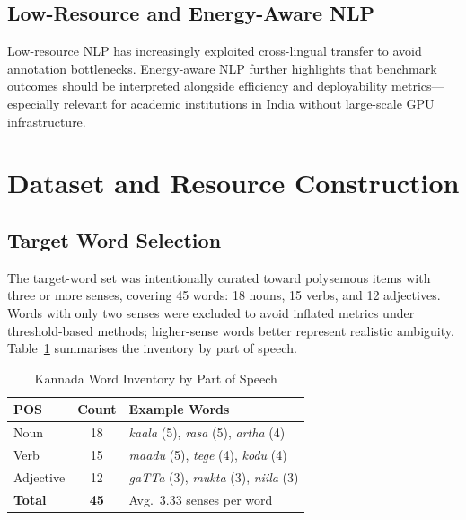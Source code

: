 \documentclass{ieeeaccess}
\begin{document}
\subsection{Low-Resource and Energy-Aware NLP}

Low-resource NLP has increasingly exploited cross-lingual transfer to avoid
annotation bottlenecks.
Energy-aware NLP \cite{strubell2019,schwartz2020} further highlights that
benchmark outcomes should be interpreted alongside efficiency and deployability
metrics---especially relevant for academic institutions in India without
large-scale GPU infrastructure.

\section{Dataset and Resource Construction}
\label{sec:dataset}

\subsection{Target Word Selection}

The target-word set was intentionally curated toward polysemous items with
three or more senses, covering 45 words: 18 nouns, 15 verbs, and 12 adjectives.
Words with only two senses were excluded to avoid inflated metrics under
threshold-based methods; higher-sense words better represent realistic
ambiguity.
Table~\ref{tab:wordstats} summarises the inventory by part of speech.

\begin{table}[t!]
\centering
\caption{Kannada Word Inventory by Part of Speech}
\label{tab:wordstats}
\begin{tabular}{l c l}
\toprule
\textbf{POS} & \textbf{Count} & \textbf{Example Words}\\
\midrule
Noun      & 18 & \textit{kaala} (5), \textit{rasa} (5), \textit{artha} (4)\\
Verb      & 15 & \textit{maadu} (5), \textit{tege} (4), \textit{kodu} (4)\\
Adjective & 12 & \textit{gaTTa} (3), \textit{mukta} (3), \textit{niila} (3)\\
\midrule
\textbf{Total} & \textbf{45} & Avg.\ 3.33 senses per word\\
\bottomrule
\end{tabular}
\end{table}
\end{document}

